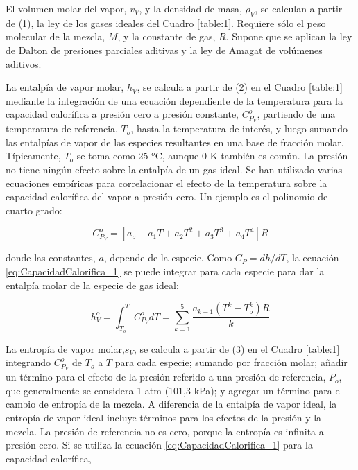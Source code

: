 \documentclass[11pt]{book}
\begin{document}
El volumen molar del vapor, $v_V$, y la densidad de masa, $\rho_V$, se calculan a partir de (1), la ley de los gases ideales del Cuadro \ref{table:1}. Requiere sólo el peso molecular de la mezcla, $M$, y la constante de gas, $R$. Supone que se aplican la ley de Dalton de presiones parciales aditivas y la ley de Amagat de volúmenes aditivos.

La entalpía de vapor molar, $h_V$, se calcula a partir de (2) en el Cuadro \ref{table:1} mediante la integración de una ecuación dependiente de la temperatura para la capacidad calorífica a presión cero a presión constante, $C_{P_V}^o$, partiendo de una temperatura de referencia, $T_o$, hasta la temperatura de interés, y luego sumando las entalpías de vapor de las especies resultantes en una base de fracción molar. Típicamente, $T_o$ se toma como 25 $^o$C, aunque 0 K también es común. La presión no tiene ningún efecto sobre la entalpía de un gas ideal. Se han utilizado varias ecuaciones empíricas para correlacionar el efecto de la temperatura sobre la capacidad calorífica del vapor a presión cero. Un ejemplo es el polinomio de cuarto grado:

\begin{equation}
    \label{eq:CapacidadCalorifica_1}
    C_{P_V}^o = \left[ a_o + a_1 T + a_2 T^2 + a_3 T^3 + a_4 T^4 \right] R
\end{equation}

donde las constantes, $a$, depende de la especie. Como $C_P = dh/dT$, la ecuación \ref{eq:CapacidadCalorifica_1} se puede integrar para cada especie para dar la entalpía molar de la especie de gas ideal:

\begin{equation}
    \label{eq:CapacidadCalorifica_2}
    h_V^o = \int_{T_o}^{T} C_{P_V}^o dT = \sum_{k = 1}^{5} \frac{a_{k-1} (T^k - T^k_o) R}{k}
\end{equation}

La entropía de vapor molar,$s_V$, se calcula a partir de (3) en el Cuadro \ref{table:1} integrando $C_{P_V}^o$ de $T_o$ a $T$ para cada especie; sumando por fracción molar; añadir un término para el efecto de la presión referido a una presión de referencia, $P_o$, que generalmente se considera 1 atm (101,3 kPa); y agregar un término para el cambio de entropía de la mezcla. A diferencia de la entalpía de vapor ideal, la entropía de vapor ideal incluye términos para los efectos de la presión y la mezcla. La presión de referencia no es cero, porque la entropía es infinita a presión cero. Si se utiliza la ecuación \ref{eq:CapacidadCalorifica_1} para la capacidad calorífica,
\end{document}
